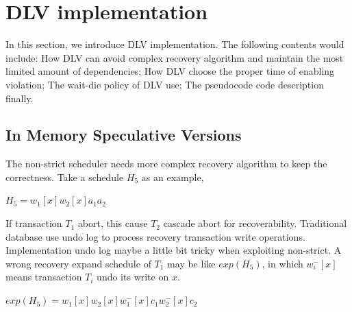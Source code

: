 \documentclass[conference]{IEEEtran}
\begin{document}


\section{DLV implementation}
\label{sec:implement}

In this section, we introduce DLV implementation.
The following contents would include:
How DLV can avoid complex recovery algorithm and maintain the most limited amount of dependencies;
How DLV choose the proper time of enabling violation;
The wait-die policy of DLV use;
The pseudocode code description finally.

\subsection {In Memory Speculative Versions}

The non-strict scheduler needs more complex recovery algorithm to keep the correctness.
Take a schedule ${H_5}$ as an example,

\begin{center}
${H_5 = w_1[x]w_2[x]a_1a_2}$
\end{center}

If transaction ${T_1}$ abort, this cause ${T_2}$ cascade abort for recoverability.
Traditional database use undo log to process recovery transaction write operations.
Implementation undo log maybe a little bit tricky when exploiting non-strict.
A wrong recovery expand schedule of ${T_1}$ may be like ${exp(H_5)}$,
in which ${w^-_i[x]}$ means transaction ${T_i}$ undo its write on ${x}$.

\begin{center}
  ${exp(H_5) =  w_1[x]w_2[x]w^-_1[x]c_1w^-_2[x]c_2}$
\end{center}
\end{document}
